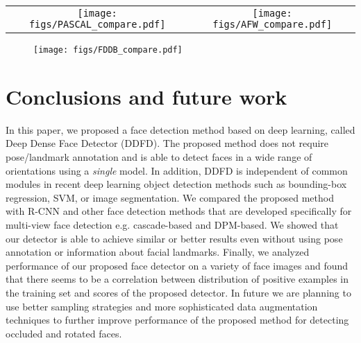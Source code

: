 \documentclass{sig-alternate-2013}
\begin{document}
\begin{figure*}[t]
  \centering
  	\begin{tabular}{cc}
    	\texttt{[image: figs/PASCAL\_compare.pdf]} &
    	\texttt{[image: figs/AFW\_compare.pdf]}
    \end{tabular}
  \caption{}
  \label{fig:performance comparison}
  \vspace{-.1in}
\end{figure*}


\begin{figure}[t]
  \centering
  \texttt{[image: figs/FDDB\_compare.pdf]}
  \caption{}
  \label{fig:performance_comparison_fddb}
    \vspace{-.1in}
\end{figure}




\section{Conclusions and future work}
In this paper, we proposed a face detection method based on deep learning, called Deep Dense Face Detector (DDFD).  The proposed method does not require pose/landmark annotation and is able to detect faces in a wide range of orientations using a \textit{single} model. In addition, DDFD is independent of common modules in recent deep learning object detection methods such as bounding-box regression, SVM, or image segmentation. We compared the proposed method with R-CNN and  other face detection methods that are developed specifically for multi-view face detection e.g. cascade-based and DPM-based. We showed that our detector is able to achieve similar or better results even without using pose annotation or information about facial landmarks. Finally, we analyzed performance of our proposed face detector on a variety of face images and found that there seems to be a correlation between distribution of positive examples in the training set and scores of the proposed detector. In future we are planning to use better sampling strategies and more sophisticated data augmentation techniques to further improve performance of the proposed method for detecting occluded and rotated faces. 




\end{document}
